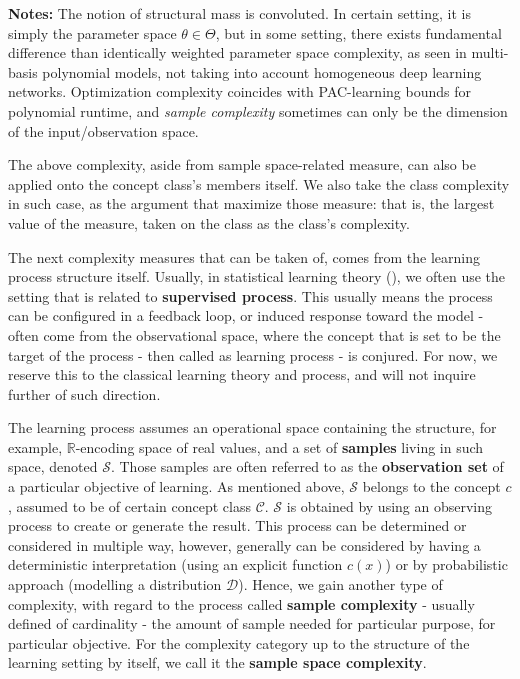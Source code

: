 \documentclass[10pt]{article}
\begin{document}
\begin{table}[htbp]
\begin{threeparttable}
    \begin{tablenotes}
      \footnotesize
      \item[] \textbf{Notes:} The notion of structural mass is convoluted. In certain setting, it is simply the parameter space $\theta\in\Theta$, but in some setting, there exists fundamental difference than identically weighted parameter space complexity, as seen in multi-basis polynomial models, not taking into account homogeneous deep learning networks. Optimization complexity coincides with PAC-learning bounds for polynomial runtime, and \textit{sample complexity} sometimes can only be the dimension of the input/observation space.
    \end{tablenotes}
  \end{threeparttable}
\end{table}

The above complexity, aside from sample space-related measure, can also be applied onto the concept class's members itself. We also take the class complexity in such case, as the argument that maximize those measure: that is, the largest value of the measure, taken on the class as the class's complexity. 

The next complexity measures that can be taken of, comes from the learning process structure itself. Usually, in statistical learning theory (\cite{STL_Hajek_Maxim_2021,10.5555/2371238,10.5555/2621980}), we often use the setting that is related to \textbf{supervised process}. This usually means the process can be configured in a feedback loop, or induced response toward the model - often come from the observational space, where the concept that is set to be the target of the process - then called as learning process - is conjured. For now, we reserve this to the classical learning theory and process, and will not inquire further of such direction. 

The learning process assumes an operational space containing the structure, for example, $\mathbb{R}$-encoding space of real values, and a set of \textbf{samples} living in such space, denoted $\mathcal{S}$. Those samples are often referred to as the \textbf{observation set} of a particular objective of learning. As mentioned above, $\mathcal{S}$ belongs to the concept $c$, assumed to be of certain concept class $\mathcal{C}$. $\mathcal{S}$ is obtained by using an observing process to create or generate the result. This process can be determined or considered in multiple way, however, generally can be considered by having a deterministic interpretation (using an explicit function $c(x)$) or by probabilistic approach (modelling a distribution $\mathcal{D}$). Hence, we gain another type of complexity, with regard to the process called \textbf{sample complexity} - usually defined of cardinality - the amount of sample needed for particular purpose, for particular objective. For the complexity category up to the structure of the learning setting by itself, we call it the \textbf{sample space complexity}. 
\end{document}
